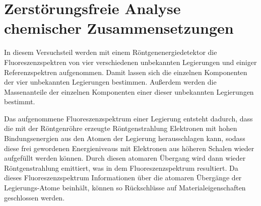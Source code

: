 \section{Zerstörungsfreie Analyse chemischer Zusammensetzungen}\label{sec:materialanalyse}
In diesem Versuchsteil werden mit einem Röntgenenergiedetektor die Fluoreszenzspektren von vier verschiedenen unbekannten Legierungen
und einiger Referenzspektren aufgenommen. Damit lassen sich die einzelnen Komponenten der vier unbekannten Legierungen bestimmen.
Außerdem werden die Massenanteile der einzelnen Komponenten einer dieser unbekannten Legierungen bestimmt.\par
Das aufgenommene Fluoreszenzspektrum einer Legierung entsteht dadurch, dass die mit der Röntgenröhre erzeugte Röntgenstrahlung
Elektronen mit hohen Bindungsenergien aus den Atomen der Legierung herausschlagen kann, sodass diese frei gewordenen Energieniveaus mit
Elektronen aus höheren Schalen wieder aufgefüllt werden können. Durch diesen atomaren Übergang wird dann wieder Röntgenstrahlung
emittiert, was in dem Fluoreszenzspektrum resultiert. Da dieses Fluoreszenzspektrum Informationen über die atomaren Übergänge
der Legierungs-Atome beinhält, können so Rückschlüsse auf Materialeigenschaften geschlossen werden.
